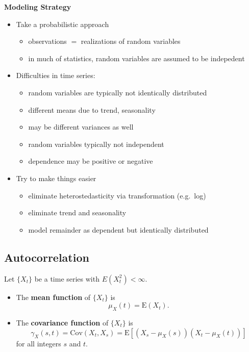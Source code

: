 \documentclass[]{book}
\providecommand{\tightlist}{%
  \setlength{\itemsep}{0pt}\setlength{\parskip}{0pt}}
\begin{document}
\textbf{Modeling Strategy}

\begin{itemize}
\tightlist
\item
  Take a probabilistic approach

  \begin{itemize}
  \tightlist
  \item
    observations \(=\) realizations of random variables
  \item
    in much of statistics, random variables are assumed to be indepedent
  \end{itemize}
\item
  Difficulties in time series:

  \begin{itemize}
  \tightlist
  \item
    random variables are typically not identically distributed
  \item
    different means due to trend, seasonality
  \item
    may be different variances as well
  \item
    random variables typically not independent
  \item
    dependence may be positive or negative
  \end{itemize}
\item
  Try to make things easier

  \begin{itemize}
  \tightlist
  \item
    eliminate heterostedasticity via transformation (e.g.~log)
  \item
    eliminate trend and seasonality
  \item
    model remainder as dependent but identically distributed
  \end{itemize}
\end{itemize}

\subsection{Autocorrelation}\label{autocorrelation}

Let \(\{X_t\}\) be a time series with \(E(X_t^2)<\infty\).

\begin{itemize}
\tightlist
\item
  The \textbf{mean function} of \(\{X_t\}\) is \[
    \mu_X(t)=\mathrm{E}(X_t).
    \]
\item
  The \textbf{covariance function} of \(\{X_t\}\) is \[
    \gamma_X(s,t)=\mathrm{Cov}(X_t,X_s) = \mathrm{E}[(X_s-\mu_X(s))(X_t-\mu_X(t))]
    \] for all integers \(s\) and \(t\).
\end{itemize}
\end{document}

